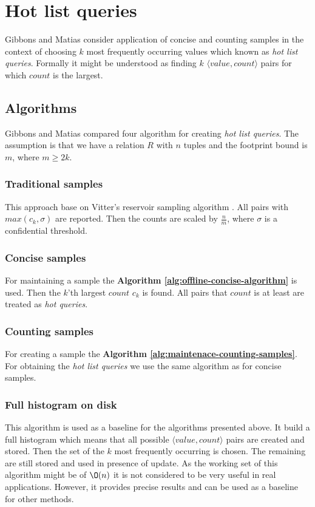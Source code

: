 \section{Hot list queries}
Gibbons and Matias consider application of concise and counting
samples in the context of choosing $k$ most frequently occurring
values which known as \textit{hot list queries}. Formally it might be
understood as finding $k$ $\langle value, count \rangle$ pairs for
which $count$ is the largest.

\subsection{Algorithms}
Gibbons and Matias \cite{GM98} compared four algorithm for creating
\textit{hot list queries}. The assumption is that we have a relation
$R$ with $n$ tuples and the footprint bound is $m$, where $m \geq 2k$.

\subsubsection{Traditional samples}
This approach base on Vitter's reservoir sampling algorithm
\cite{Vit85}.
All pairs with $max(c_k, \sigma)$ are reported. Then the counts are
scaled by $\frac{n}{m}$, where $\sigma$ is a confidential threshold.

\subsubsection{Concise samples}
For maintaining a sample the \textbf{Algorithm
  \ref{alg:offline-concise-algorithm}} is used. Then the $k$'th
largest $count$ $c_k$ is found. All pairs that $count$ is at least are
treated as \textit{hot queries}.
\subsubsection{Counting samples}
For creating a sample the \textbf{Algorithm
  \ref{alg:maintenace-counting-samples}}. For obtaining the
\textit{hot list queries} we use the same algorithm as for concise
samples.

\subsubsection{Full histogram on disk}
This algorithm is used as a baseline for the algorithms presented
above. It build a full histogram which means that all possible
$\langle value, count \rangle$ pairs are created and stored. Then the
set of the $k$ most frequently occurring is chosen. The remaining are
still stored and used in presence of update. As the working set of
this algorithm might be of $\O(n)$ it is not considered to be
very useful in real applications. However, it provides precise results
and can be used as a baseline for other methods.
